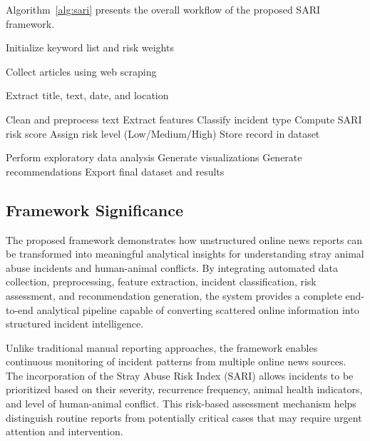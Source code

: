 \documentclass[conference]{IEEEtran}
\begin{document}
Algorithm~\ref{alg:sari} presents the overall workflow of the proposed SARI framework.

\begin{algorithm}[H]
\caption{Pseudo Code of the Proposed SARI Framework}
\label{alg:sari}
\begin{algorithmic}[1]
\State Initialize keyword list and risk weights

    \State Collect articles using web scraping

        \State Extract title, text, date, and location

            \State Clean and preprocess text
            \State Extract features
            \State Classify incident type
            \State Compute SARI risk score
            \State Assign risk level (Low/Medium/High)
            \State Store record in dataset
        \EndIf
    \EndFor
\EndFor

\State Perform exploratory data analysis
\State Generate visualizations
\State Generate recommendations
\State Export final dataset and results
\end{algorithmic}
\end{algorithm}

\subsection{Framework Significance}

The proposed framework demonstrates how unstructured online news reports can be transformed into meaningful analytical insights for understanding stray animal abuse incidents and human-animal conflicts. By integrating automated data collection, preprocessing, feature extraction, incident classification, risk assessment, and recommendation generation, the system provides a complete end-to-end analytical pipeline capable of converting scattered online information into structured incident intelligence.

Unlike traditional manual reporting approaches, the framework enables continuous monitoring of incident patterns from multiple online news sources. The incorporation of the Stray Abuse Risk Index (SARI) allows incidents to be prioritized based on their severity, recurrence frequency, animal health indicators, and level of human-animal conflict. This risk-based assessment mechanism helps distinguish routine reports from potentially critical cases that may require urgent attention and intervention.
\end{document}
